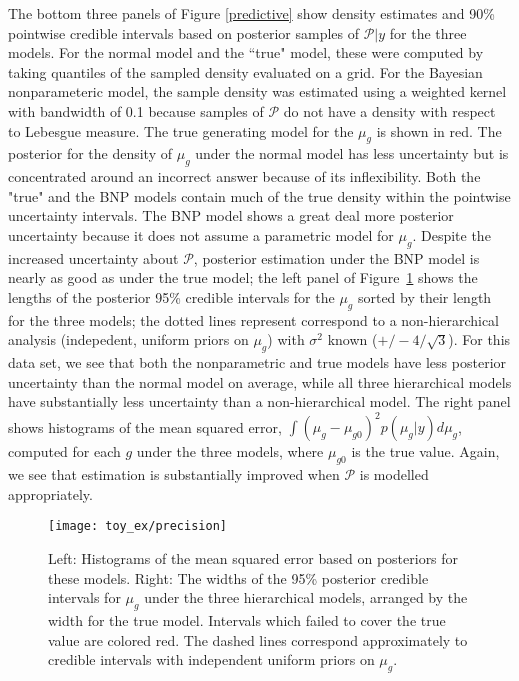 The bottom three panels of Figure \ref{predictive} show density estimates and 90\% pointwise credible intervals based on posterior samples of $\mathcal{P}|y$ for the three models. For the normal model and the ``true" model, these were computed by taking quantiles of the sampled density evaluated on a grid. For the Bayesian nonparameteric model, the sample density was estimated using a weighted kernel with bandwidth of 0.1 because samples of $\mathcal{P}$ do not have a density with respect to Lebesgue measure. The true generating model for the $\mu_g$ is shown in red. The posterior for the density of $\mu_g$ under the normal model has less uncertainty but is concentrated around an incorrect answer because of its inflexibility. Both the "true" and the BNP models contain much of the true density within the pointwise uncertainty intervals. The BNP model shows a great deal more posterior uncertainty because it does not assume a parametric model for $\mu_g$. Despite the increased uncertainty about $\mathcal{P}$, posterior estimation under the BNP model is nearly as good as under the true model; the left panel of Figure~\ref{precision} shows the lengths of the posterior 95\% credible intervals for the $\mu_g$ sorted by their length for the three models; the dotted lines represent correspond to a non-hierarchical analysis (indepedent, uniform priors on $\mu_g$) with $\sigma^2$ known ($+/- 4/\sqrt{3}$). For this data set, we see that both the nonparametric and true models have less posterior uncertainty than the normal model on average, while all three hierarchical models have substantially less uncertainty than a non-hierarchical model. The right panel shows histograms of the mean squared error, $\int (\mu_g - \mu_{g0})^2 p(\mu_g|y) d\mu_g$, computed for each $g$ under the three models, where $\mu_{g0}$ is the true value. Again, we see that estimation is substantially improved when $\mathcal{P}$ is modelled appropriately.


\begin{figure}[h!]
\centering
\texttt{[image: toy\_ex/precision]}
\begin{minipage}{.8\textwidth}
\caption{\small Left: Histograms of the mean squared error based on posteriors for these models. Right: The widths of the 95\% posterior credible intervals for $\mu_g$ under the three hierarchical models, arranged by the width for the true model. Intervals which failed to cover the true value are colored red. The dashed lines correspond approximately to credible intervals with independent uniform priors on $\mu_g$.}
\end{minipage}
\label{precision}
\end{figure}


